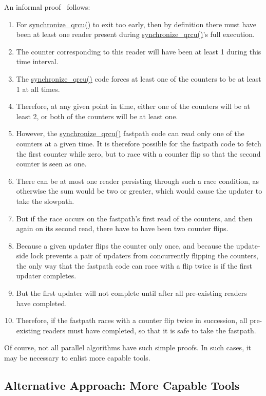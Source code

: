 An informal proof~\cite{PaulMcKenney2007QRCUpatch}
follows:

\begin{enumerate}
\item	For \url{synchronize_qrcu()} to exit too early, then
	by definition there must have been at least one reader
	present during \url{synchronize_qrcu()}'s full
	execution.
\item	The counter corresponding to this reader will have been
	at least 1 during this time interval.
\item	The \url{synchronize_qrcu()} code forces at least one
	of the counters to be at least 1 at all times.
\item	Therefore, at any given point in time, either one of the
	counters will be at least 2, or both of the counters will
	be at least one.
\item	However, the \url{synchronize_qrcu()} fastpath code
	can read only one of the counters at a given time.
	It is therefore possible for the fastpath code to fetch
	the first counter while zero, but to race with a counter
	flip so that the second counter is seen as one.
\item	There can be at most one reader persisting through such
	a race condition, as otherwise the sum would be two or
	greater, which would cause the updater to take the slowpath.
\item	But if the race occurs on the fastpath's first read of the
	counters, and then again on its second read, there have
	to have been two counter flips.
\item	Because a given updater flips the counter only once, and
	because the update-side lock prevents a pair of updaters
	from concurrently flipping the counters, the only way that
	the fastpath code can race with a flip twice is if the
	first updater completes.
\item	But the first updater will not complete until after all
	pre-existing readers have completed.
\item	Therefore, if the fastpath races with a counter flip
	twice in succession, all pre-existing readers must have
	completed, so that it is safe to take the fastpath.
\end{enumerate}

Of course, not all parallel algorithms have such simple proofs.
In such cases, it may be necessary to enlist more capable tools.

\subsection{Alternative Approach: More Capable Tools}
\label{app:formal:Alternative Approach: More Capable Tools}

